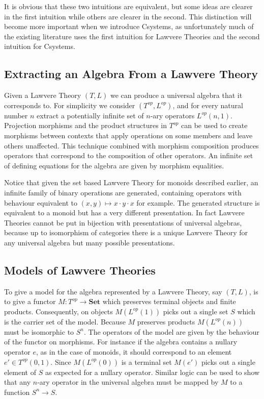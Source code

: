 \documentclass[12pt,a4paper,twoside,openright]{report}
\newcommand{\catname}[1]{\mathbf{#1}}
\begin{document}
It is obvious that these two intuitions are equivalent, but some ideas are
clearer in the first intuition while others are clearer in the second. This
distinction will become more important when we introduce Csystems, as
unfortunately much of the existing literature uses the first intuition for
Lawvere Theories and the second intuition for Csystems.

\subsection{Extracting an Algebra From a Lawvere Theory}
Given a Lawvere Theory $(T,L)$ we can produce a universal algebra that it
corresponds to. For simplicity we consider $(T^{op}, L^{op})$, and for every
natural number $n$ extract a potentially infinite set of $n$-ary operators
$L^{op}(n,1)$. Projection morphisms and the product structures in $T^{op}$ can
be used to create morphisms between contexts that apply operations on some
members and leave others unaffected. This technique combined with morphism
composition produces operators that correspond to the composition of other
operators. An infinite set of defining equations for the algebra are given by
morphism equalities.

Notice that given the set based Lawvere Theory for monoids described earlier, an
infinite family of binary operations are generated, containing operators with
behaviour equivalent to $(x,y)\mapsto x\cdot y\cdot x$ for example. The
generated structure is equivalent to a monoid but has a very different
presentation. In fact Lawvere Theories cannot be put in bijection with
presentations of universal algebras, because up to isomorphism of categories
there is a unique Lawvere Theory for any universal algebra but many possible
presentations.

\subsection{Models of Lawvere Theories}
To give a model for the algebra represented by a Lawvere Theory, say $(T, L)$,
is to give a functor $M: T^{op}\to \catname{Set}$ which preserves terminal
objects and finite products. Consequently, on objects $M(L^{op}(1))$ picks out a
single set $S$ which is the carrier set of the model. Because $M$ preserves
products $M(L^{op}(n))$ must be isomorphic to $S^n$. The operators of the model
are given by the behaviour of the functor on morphisms. For instance if the
algebra contains a nullary operator $e$, as in the case of monoids, it should
correspond to an element $e'\in T^{op}(0,1)$. Since $M(L^{op}(0))$ is a terminal
set $M(e')$ picks out a single element of $S$ as expected for a nullary
operator. Similar logic can be used to show that any $n$-ary operator in the
universal algebra must be mapped by $M$ to a function $S^n\to S$.
\end{document}
